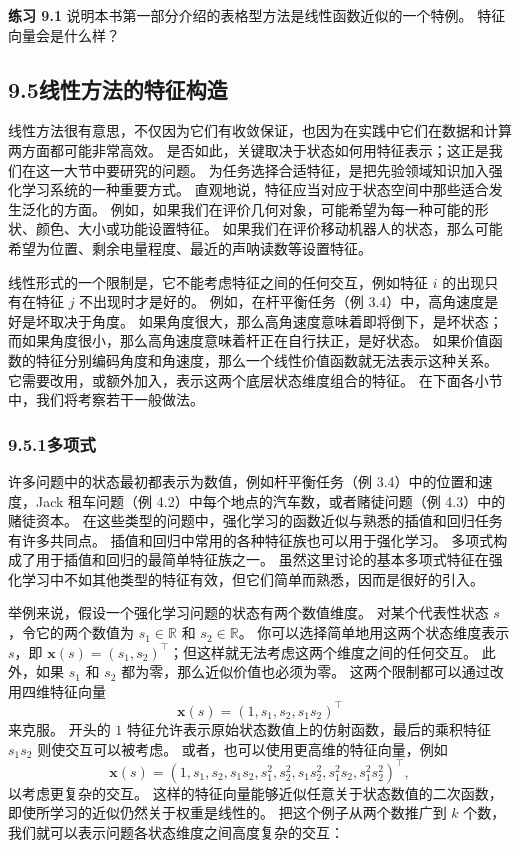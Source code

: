 \documentclass[UTF8,12pt,a4paper,fontset=fandol]{ctexart}
\begin{document}
\noindent\textbf{练习 9.1}
说明本书第一部分介绍的表格型方法是线性函数近似的一个特例。
特征向量会是什么样？

\subsection*{9.5\quad 线性方法的特征构造}

线性方法很有意思，不仅因为它们有收敛保证，也因为在实践中它们在数据和计算两方面都可能非常高效。
是否如此，关键取决于状态如何用特征表示；这正是我们在这一大节中要研究的问题。
为任务选择合适特征，是把先验领域知识加入强化学习系统的一种重要方式。
直观地说，特征应当对应于状态空间中那些适合发生泛化的方面。
例如，如果我们在评价几何对象，可能希望为每一种可能的形状、颜色、大小或功能设置特征。
如果我们在评价移动机器人的状态，那么可能希望为位置、剩余电量程度、最近的声呐读数等设置特征。

线性形式的一个限制是，它不能考虑特征之间的任何交互，例如特征 $i$ 的出现只有在特征 $j$ 不出现时才是好的。
例如，在杆平衡任务（例 3.4）中，高角速度是好是坏取决于角度。
如果角度很大，那么高角速度意味着即将倒下，是坏状态；而如果角度很小，那么高角速度意味着杆正在自行扶正，是好状态。
如果价值函数的特征分别编码角度和角速度，那么一个线性价值函数就无法表示这种关系。
它需要改用，或额外加入，表示这两个底层状态维度组合的特征。
在下面各小节中，我们将考察若干一般做法。

\subsubsection*{9.5.1\quad 多项式}

许多问题中的状态最初都表示为数值，例如杆平衡任务（例 3.4）中的位置和速度，Jack 租车问题（例 4.2）中每个地点的汽车数，或者赌徒问题（例 4.3）中的赌徒资本。
在这些类型的问题中，强化学习的函数近似与熟悉的插值和回归任务有许多共同点。
插值和回归中常用的各种特征族也可以用于强化学习。
多项式构成了用于插值和回归的最简单特征族之一。
虽然这里讨论的基本多项式特征在强化学习中不如其他类型的特征有效，但它们简单而熟悉，因而是很好的引入。

举例来说，假设一个强化学习问题的状态有两个数值维度。
对某个代表性状态 $s$，令它的两个数值为 $s_1\in\mathbb{R}$ 和 $s_2\in\mathbb{R}$。
你可以选择简单地用这两个状态维度表示 $s$，即 $\mathbf{x}(s)=(s_1,s_2)^\top$；但这样就无法考虑这两个维度之间的任何交互。
此外，如果 $s_1$ 和 $s_2$ 都为零，那么近似价值也必须为零。
这两个限制都可以通过改用四维特征向量
\[
\mathbf{x}(s)=(1,s_1,s_2,s_1s_2)^\top
\]
来克服。
开头的 $1$ 特征允许表示原始状态数值上的仿射函数，最后的乘积特征 $s_1s_2$ 则使交互可以被考虑。
或者，也可以使用更高维的特征向量，例如
\[
\mathbf{x}(s)=(1,s_1,s_2,s_1s_2,s_1^2,s_2^2,s_1s_2^2,s_1^2s_2,s_1^2s_2^2)^\top,
\]
以考虑更复杂的交互。
这样的特征向量能够近似任意关于状态数值的二次函数，即使所学习的近似仍然关于权重是线性的。
把这个例子从两个数推广到 $k$ 个数，我们就可以表示问题各状态维度之间高度复杂的交互：
\end{document}
